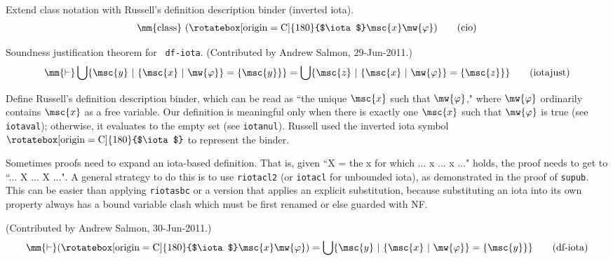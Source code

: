 \begin{metadefinition} Extend class notation with Russell's
definition description binder
     (inverted iota).
\begin{align}
{\rm \mm{class}~} ( \mathrm{\rotatebox[origin=C]{180}{$\iota$}} \msc{x}
    \mw{\varphi} )\label{eq:cio}\tag{cio}
\end{align}
\end{metadefinition}

\begin{lemma} Soundness justification theorem for {\tt
df-iota}.  (Contributed by Andrew
       Salmon, 29-Jun-2011.)
\begin{align}
\mm{\vdash} \bigcup \{ \msc{y} ~\vert~ \{ \msc{x} ~\vert~ \mw{\varphi} \} = \{
    \msc{y} \} \} = \bigcup \{ \msc{z} ~\vert~ \{ \msc{x} ~\vert~ \mw{\varphi}
    \} = \{ \msc{z} \} \}\label{eq:iotajust}\tag{iotajust}
\end{align}
\end{lemma}


\begin{metadefinition} Define Russell's definition description
binder, which can be read as
       ``the unique $\msc{x}$ such that $\mw{\varphi}$," where $\mw{\varphi}$
ordinarily contains
       $\msc{x}$ as a free variable.  Our definition is meaningful only when
there
       is exactly one $\msc{x}$ such that $\mw{\varphi}$ is true (see {\tt
iotaval});
       otherwise, it evaluates to the empty set (see {\tt iotanul}).  Russell
used
       the inverted iota symbol $\mathrm{\rotatebox[origin=C]{180}{$\iota$}}$
to represent the binder.

       Sometimes proofs need to expand an iota-based definition.  That is,
       given ``X = the x for which ... x ... x ..." holds, the proof needs to
       get to ``...  X ...  X ...".  A general strategy to do this is to use
       {\tt riotacl2} (or {\tt iotacl} for unbounded iota), as demonstrated in
the
       proof of {\tt supub}.  This can be easier than applying {\tt riotasbc}
or a
       version that applies an explicit substitution, because substituting an
       iota into its own property always has a bound variable clash which must
       be first renamed or else guarded with NF.

       (Contributed by Andrew Salmon, 30-Jun-2011.)
\begin{align}
\mm{\vdash} ( \mathrm{\rotatebox[origin=C]{180}{$\iota$}} \msc{x} \mw{\varphi}
    ) = \bigcup \{ \msc{y} ~\vert~ \{ \msc{x} ~\vert~ \mw{\varphi} \} = \{
    \msc{y} \} \}\label{eq:df-iota}\tag{df-iota}
\end{align}
\end{metadefinition}

